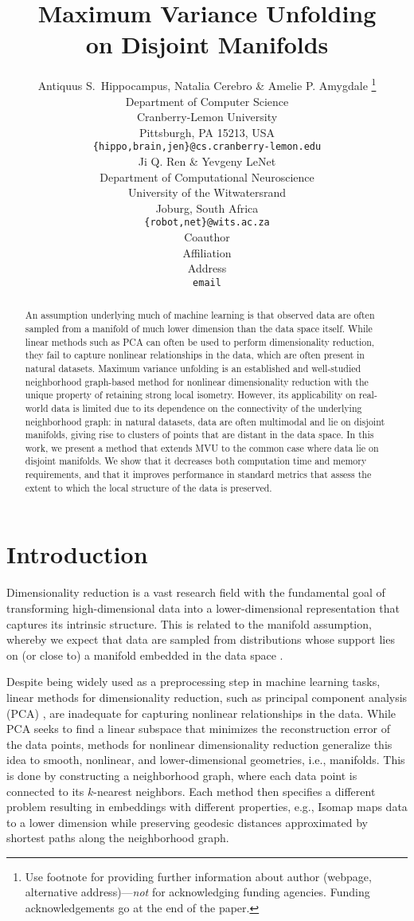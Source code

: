 \documentclass{article} %
\title{Maximum Variance Unfolding \\ on Disjoint Manifolds}
\author{Antiquus S.~Hippocampus, Natalia Cerebro \& Amelie P. Amygdale \thanks{ Use footnote for providing further information
about author (webpage, alternative address)---\emph{not} for acknowledging
funding agencies.  Funding acknowledgements go at the end of the paper.} \\
Department of Computer Science\\
Cranberry-Lemon University\\
Pittsburgh, PA 15213, USA \\
\texttt{\{hippo,brain,jen\}@cs.cranberry-lemon.edu} \\
\And
Ji Q. Ren \& Yevgeny LeNet \\
Department of Computational Neuroscience \\
University of the Witwatersrand \\
Joburg, South Africa \\
\texttt{\{robot,net\}@wits.ac.za} \\
\AND
Coauthor \\
Affiliation \\
Address \\
\texttt{email}
}
\begin{document}
\maketitle

\begin{abstract}
An assumption underlying much of machine learning is that observed data are often sampled from a manifold of much lower dimension than the data space itself. While linear methods such as PCA can often be used to perform dimensionality reduction, they fail to capture nonlinear relationships in the data, which are often present in natural datasets. Maximum variance unfolding is an established and well-studied neighborhood graph-based method for nonlinear dimensionality reduction with the unique property of retaining strong local isometry. However, its applicability on real-world data is limited due to its dependence on the connectivity of the underlying neighborhood graph: in natural datasets, data are often multimodal and lie on disjoint manifolds, giving rise to clusters of points that are distant in the data space. In this work, we present a method that extends MVU to the common case where data lie on disjoint manifolds. We show that it decreases both computation time and memory requirements, and that it improves performance in standard metrics that assess the extent to which the local structure of the data is preserved.
\end{abstract}



\section{Introduction}

Dimensionality reduction is a vast research field with the fundamental goal of transforming high-dimensional data into a lower-dimensional representation that captures its intrinsic structure. This is related to the manifold assumption, whereby we expect that data are sampled from distributions whose support lies on (or close to) a manifold embedded in the data space \citep{manifold-hypothesis}.

Despite being widely used as a preprocessing step in machine learning tasks, linear methods for dimensionality reduction, such as principal component analysis (PCA) \citep{pca}, are inadequate for capturing nonlinear relationships in the data. While PCA seeks to find a linear subspace that minimizes the reconstruction error of the data points, methods for nonlinear dimensionality reduction generalize this idea to smooth, nonlinear, and lower-dimensional geometries, i.e., manifolds. This is done by constructing a neighborhood graph, where each data point is connected to its $k$-nearest neighbors. Each method then specifies a different problem resulting in embeddings with different properties, e.g., Isomap \citep{isomap} maps data to a lower dimension while preserving geodesic distances approximated by shortest paths along the neighborhood graph.
\end{document}
